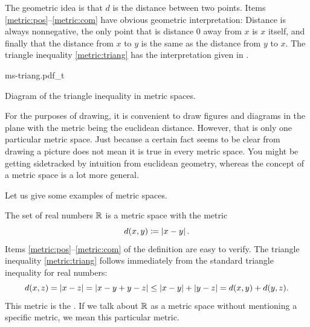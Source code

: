 The geometric idea is that $d$ is the distance between two points. 
Items \ref{metric:pos}--\ref{metric:com} have obvious geometric
interpretation: Distance is always nonnegative, the only point that is
distance 0 away from $x$ is $x$ itself, and finally that the distance from
$x$ to $y$ is the same as the distance from $y$ to $x$.  The triangle
inequality \ref{metric:triang} has the interpretation given in
.
\begin{myfigureht}
{ms-triang.pdf_t}
\caption{Diagram of the triangle inequality in metric spaces.\label{fig:mstriang}}
\end{myfigureht}

For the purposes of drawing, it is convenient to draw figures and
diagrams in the plane with the metric being the euclidean distance.
However, that is only one particular metric space.  Just because a
certain fact seems to be clear from drawing a picture does not mean it is
true in every metric space.
You might be getting sidetracked by intuition from euclidean geometry,
whereas the concept of a metric space is a lot more general.

Let us give some examples of metric spaces.

\begin{example}
The set of real numbers ${\mathbb{R}}$ is a metric space with the metric
\begin{equation*}
d(x,y) \coloneqq \left\lvert {x-y} \right\rvert .
\end{equation*}
Items \ref{metric:pos}--\ref{metric:com} of the definition
are easy to verify.  The
triangle inequality \ref{metric:triang} follows immediately
from the standard triangle inequality for real numbers:
\begin{equation*}
d(x,z) = \left\lvert {x-z} \right\rvert = 
\left\lvert {x-y+y-z} \right\rvert \leq
\left\lvert {x-y} \right\rvert+\left\lvert {y-z} \right\rvert =
d(x,y)+ d(y,z) .
\end{equation*}
This metric is the \emph{}.  If we talk
about ${\mathbb{R}}$ as a metric space without mentioning a specific metric, we 
mean this particular metric.
\end{example}

